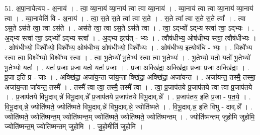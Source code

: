 \documentclass[17pt]{extarticle}
\begin{document}
51. अ॒पा॒नायेत्य॑प - अ॒नाय॑ । . त्वा॒ व्या॒नाय॑ व्या॒नाय॑ त्वा त्वा व्या॒नाय॑ । . व्या॒नाय॑ त्वा त्वा व्या॒नाय॑ व्या॒नाय॑ त्वा । . व्या॒नायेति॑ वि - अ॒नाय॑ । . त्वा॒ स॒ते स॒ते त्वा᳚ त्वा स॒ते । . स॒ते त्वा᳚ त्वा स॒ते स॒ते त्वा᳚ । . त्वा ऽस॒ते ऽस॑ते त्वा॒ त्वा ऽस॑ते । . अस॑ते त्वा॒ त्वा ऽस॒ते ऽस॑ते त्वा । . त्वा॒ ऽद्भ्यो᳚ ऽद्भ्य स्त्वा᳚ त्वा॒ ऽद्भ्यः । . अ॒द्भ्य स्त्वा᳚ त्वा॒ ऽद्भ्यो᳚ ऽद्भ्य स्त्वा᳚ । . अ॒द्भ्य इत्य॑त् - भ्यः । . त्वौष॑धीभ्य॒ ओष॑धीभ्य स्त्वा॒ त्वौष॑धीभ्यः । . ओष॑धीभ्यो॒ विश्वे᳚भ्यो॒ विश्वे᳚भ्य॒ ओष॑धीभ्य॒ ओष॑धीभ्यो॒ विश्वे᳚भ्यः । . ओष॑धीभ्य॒ इत्योष॑धि - भ्यः॒ । . विश्वे᳚भ्य स्त्वा त्वा॒ विश्वे᳚भ्यो॒ विश्वे᳚भ्य स्त्वा । . त्वा॒ भू॒तेभ्यो॑ भू॒तेभ्य॑ स्त्वा त्वा भू॒तेभ्यः॑ । . भू॒तेभ्यो॒ यतो॒ यतो॑ भू॒तेभ्यो॑ भू॒तेभ्यो॒ यतः॑ । . यतः॑ प्र॒जाः प्र॒जा यतो॒ यतः॑ प्र॒जाः । . प्र॒जा अक्खि॑द्रा॒ अक्खि॑द्राः प्र॒जाः प्र॒जा अक्खि॑द्राः । . प्र॒जा इति॑ प्र - जाः । . अक्खि॑द्रा॒ अजा॑य॒न्ता जा॑य॒न्ता क्खि॑द्रा॒ अक्खि॑द्रा॒ अजा॑यन्त । . अजा॑यन्त॒ तस्मै॒ तस्मा॒ अजा॑य॒न्ता जा॑यन्त॒ तस्मै᳚ । . तस्मै᳚ त्वा त्वा॒ तस्मै॒ तस्मै᳚ त्वा । . त्वा॒ प्र॒जाप॑तये प्र॒जाप॑तये त्वा त्वा प्र॒जाप॑तये । . प्र॒जाप॑तये विभू॒दाव्.न्ने॑ विभू॒दाव्.न्ने᳚ प्र॒जाप॑तये प्र॒जाप॑तये विभू॒दाव्.न्ने᳚ । . प्र॒जाप॑तय॒ इति॑ प्र॒जा - प॒त॒ये॒ । . वि॒भू॒दाव्.न्ने॒ ज्योति॑ष्मते॒ ज्योति॑ष्मते विभू॒दाव्.न्ने॑ विभू॒दाव्.न्ने॒ ज्योति॑ष्मते । . वि॒भू॒दाव्.न्न॒ इति॑ विभु - दाव्.न्ने᳚ । . ज्योति॑ष्मते॒ ज्योति॑ष्मन्त॒म् ज्योति॑ष्मन्त॒म् ज्योति॑ष्मते॒ ज्योति॑ष्मते॒ ज्योति॑ष्मन्तम् । . ज्योति॑ष्मन्तम् जुहोमि जुहोमि॒ ज्योति॑ष्मन्त॒म् ज्योति॑ष्मन्तम् जुहोमि । . जु॒हो॒मीति॑ जुहोमि । \newline
\end{document}

